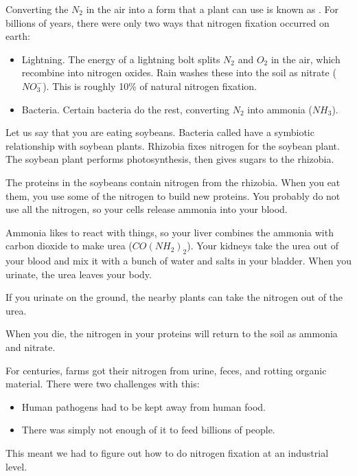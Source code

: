 Converting the $N_2$ in the air into a form that a plant can use
is known as . For billions of years, there
were only two ways that nitrogen fixation occurred on earth:
\begin{itemize}
\item Lightning. The energy of a lightning bolt splits $N_2$ and $O_2$ in the air, which recombine into nitrogen oxides. Rain washes these into the soil as nitrate ($NO_3^-$). This is roughly 10\% of natural nitrogen fixation.
\item Bacteria. Certain bacteria do the rest, converting $N_2$ into ammonia ($NH_3$).
\end{itemize} 

Let us say that you are eating soybeans. Bacteria
called  have a symbiotic relationship with
soybean plants. Rhizobia fixes nitrogen for the soybean plant. The
soybean plant performs photosynthesis, then gives sugars to the
rhizobia.

The proteins in the soybeans contain nitrogen from the rhizobia. When
you eat them, you use some of the nitrogen to build new proteins. You
probably do not use all the nitrogen, so your cells release ammonia into your blood.

Ammonia likes to react with things, so your liver combines the ammonia
with carbon dioxide to make urea ($CO(NH_2)_2$). Your kidneys take
the urea out of your blood and mix it with a bunch of water and salts
in your bladder.  When you urinate, the urea leaves your body.

If you urinate on the ground, the nearby plants can take the nitrogen out of
the urea.

When you die, the nitrogen in your proteins will return to the soil as
ammonia and nitrate.

For centuries, farms got their nitrogen from urine, feces, and rotting
organic material. There were two challenges with this:
\begin{itemize}
\item Human pathogens had to be kept away from human food.
\item There was simply not enough of it to feed billions of people.
\end{itemize}

This meant we had to figure out how to do nitrogen fixation at an industrial
level.

